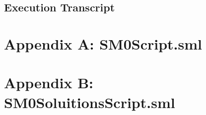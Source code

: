 \documentclass{article}
\begin{document}
\subsection{Execution Transcript}
\label{sec:execution-transcript-1}



\newpage

\section{Appendix A: SM0Script.sml}
\label{sec:append-a:-sm0scr}

\newpage
\section{Appendix B: SM0SoluitionsScript.sml}
\label{sec:append-b:-sm0s}

\newpage
\end{document}
